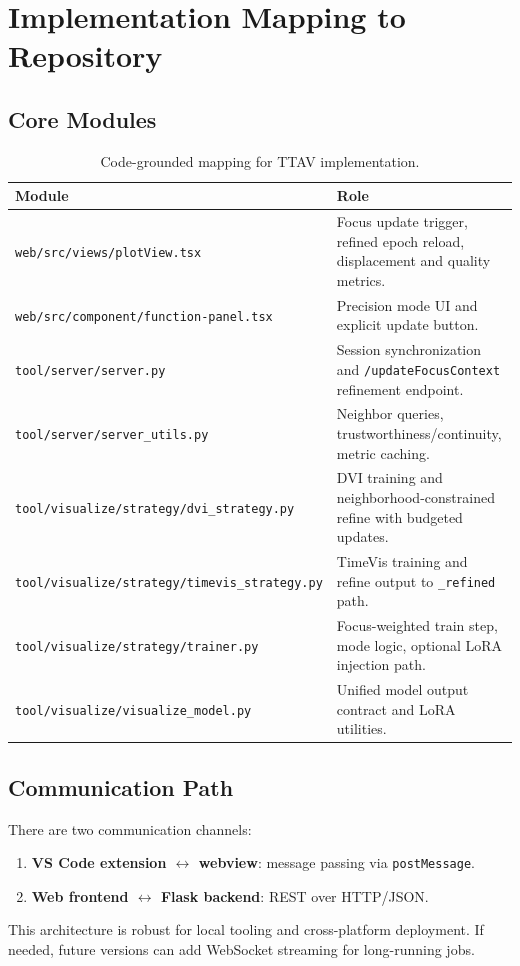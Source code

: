 \documentclass[12pt,a4paper]{report}
\newcommand{\systemname}{TTAV}
\begin{document}
\chapter{Implementation Mapping to Repository}
\section{Core Modules}
\begin{table}[htbp]
\centering
\begin{tabular}{p{}p{}}
\toprule
Module & Role \\
\midrule
\texttt{web/src/views/plotView.tsx} & Focus update trigger, refined epoch reload, displacement and quality metrics. \\
\texttt{web/src/component/function-panel.tsx} & Precision mode UI and explicit update button. \\
\texttt{tool/server/server.py} & Session synchronization and \texttt{/updateFocusContext} refinement endpoint. \\
\texttt{tool/server/server\_utils.py} & Neighbor queries, trustworthiness/continuity, metric caching. \\
\texttt{tool/visualize/strategy/dvi\_strategy.py} & DVI training and neighborhood-constrained refine with budgeted updates. \\
\texttt{tool/visualize/strategy/timevis\_strategy.py} & TimeVis training and refine output to \texttt{\_refined} path. \\
\texttt{tool/visualize/strategy/trainer.py} & Focus-weighted train step, mode logic, optional LoRA injection path. \\
\texttt{tool/visualize/visualize\_model.py} & Unified model output contract and LoRA utilities. \\
\bottomrule
\end{tabular}
\caption{Code-grounded mapping for \systemname{} implementation.}
\label{tab:mapping}
\end{table}

\section{Communication Path}
There are two communication channels:
\begin{enumerate}
\item \textbf{VS Code extension \(\leftrightarrow\) webview}: message passing via \texttt{postMessage}.
\item \textbf{Web frontend \(\leftrightarrow\) Flask backend}: REST over HTTP/JSON.
\end{enumerate}
This architecture is robust for local tooling and cross-platform deployment. If needed, future versions can add WebSocket streaming for long-running jobs.
\end{document}
